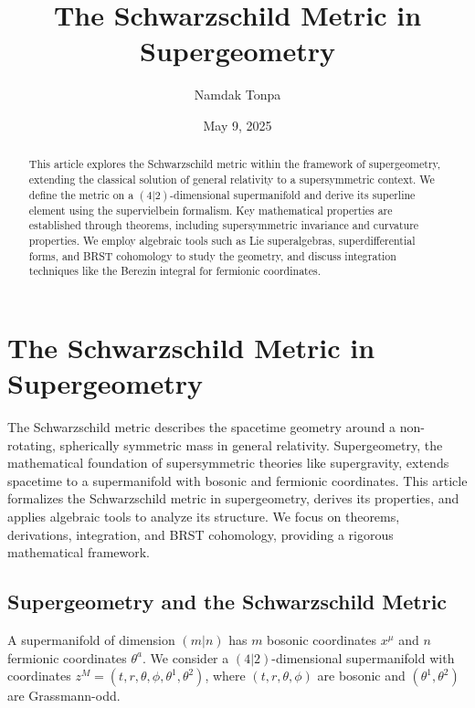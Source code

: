 \documentclass{article}
\theoremstyle{plain}
\newcommand{\supercoords}{z^{M}}
\newcommand{\boscoords}{x^{\mu}}
\newcommand{\fermcoords}{\theta^{a}}
\begin{document}
\title{The Schwarzschild Metric in Supergeometry}
\author{Namdak Tonpa}
\date{May 9, 2025}

\maketitle

\begin{abstract}
This article explores the Schwarzschild metric within the framework of supergeometry, extending the classical solution of general relativity to a supersymmetric context. We define the metric on a $(4|2)$-dimensional supermanifold and derive its superline element using the supervielbein formalism. Key mathematical properties are established through theorems, including supersymmetric invariance and curvature properties. We employ algebraic tools such as Lie superalgebras, superdifferential forms, and BRST cohomology to study the geometry, and discuss integration techniques like the Berezin integral for fermionic coordinates.
\end{abstract}

\tableofcontents


\section{The Schwarzschild Metric in Supergeometry}

The Schwarzschild metric describes the spacetime geometry around a non-rotating, spherically symmetric mass in general relativity. Supergeometry, the mathematical foundation of supersymmetric theories like supergravity, extends spacetime to a supermanifold with bosonic and fermionic coordinates. This article formalizes the Schwarzschild metric in supergeometry, derives its properties, and applies algebraic tools to analyze its structure. We focus on theorems, derivations, integration, and BRST cohomology, providing a rigorous mathematical framework.

\subsection{Supergeometry and the Schwarzschild Metric}

A supermanifold of dimension $(m|n)$ has $m$ bosonic coordinates $\boscoords$ and $n$ fermionic coordinates $\fermcoords$. We consider a $(4|2)$-dimensional supermanifold with coordinates $\supercoords = (t, r, \theta, \phi, \theta^{1}, \theta^{2})$, where $(t, r, \theta, \phi)$ are bosonic and $(\theta^{1}, \theta^{2})$ are Grassmann-odd.
\end{document}
